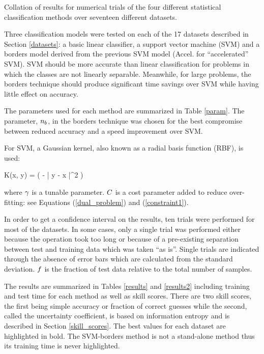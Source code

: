 \begin{table}
	\caption{Collation of results for numerical trials of the four different statistical classification methods over seventeen different datasets.}
	\label{results2}
	{\small
		
	}
\end{table}

Three classification models were tested on each of the 17 datasets described in
Section \ref{datasets}: a basic linear classifier, 
a support vector machine (SVM) and a borders
model derived from the previous SVM model (Accel. for ``accelerated'' SVM).
SVM should be more accurate than linear classification for problems in which
the classes are not linearly separable.
Meanwhile, for large problems, the borders technique should produce significant time savings over SVM while having little effect on accuracy.

The parameters used for each method are summarized in Table \ref{param}.
The parameter, $n_b$, in the borders technique
was chosen for the best compromise between reduced accuracy and a speed
improvement over SVM. 

For SVM, a Gaussian kernel, also known as a radial basis function (RBF), is used:
\begin{eqnnon}
	K(\vec x, \vec y) = \exp \left ( - \rbkernelparam | \vec y - \vec x |^2 \right )
\end{eqnnon}
where $\gamma$ is a tunable parameter. 
$C$ is a cost parameter added to reduce over-fitting: see
Equations (\ref{dual_problem}) and (\ref{constraint1}).

In order to get a confidence interval on the results,
ten trials were performed for most of the datasets.
In some cases, only a single trial was performed either because the operation
took too long or because of a pre-existing separation between test and training
data which was taken ``as is''. Single trials are indicated through the absence of
error bars which are calculated from the standard deviation.
$f$ is the fraction of test data relative to the total number
of samples.

The results are summarized in Tables \ref{results} and \ref{results2} including training
and test time for each method as well as skill scores. There are two skill scores,
the first being simple accuracy or fraction of correct guesses while the second,
called the uncertainty coefficient, is based on information entropy and is described in Section \ref{skill_scores}.
The best values for each dataset are highlighted in bold.
The SVM-borders method is not a stand-alone method thus its training time is never
highlighted.

